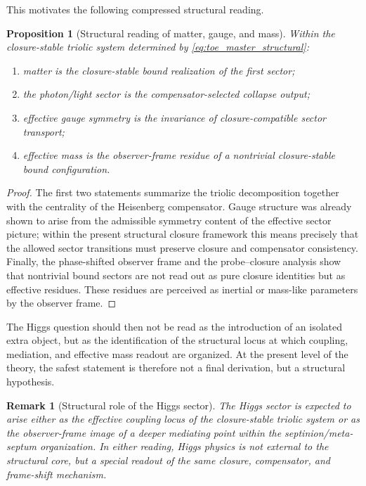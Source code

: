\documentclass[12pt,a4paper]{article}
\newtheorem{proposition}[theorem]{Proposition}
\newtheorem*{remark}{Remark}
\begin{document}
This motivates the following compressed structural reading.

\begin{proposition}[Structural reading of matter, gauge, and mass]
\label{prop:structural-matter-gauge-mass}
Within the closure-stable triolic system determined by
\eqref{eq:toe_master_structural}:
\begin{enumerate}
\item matter is the closure-stable bound realization of the first sector;
\item the photon/light sector is the compensator-selected collapse output;
\item effective gauge symmetry is the invariance of closure-compatible
sector transport;
\item effective mass is the observer-frame residue of a nontrivial
closure-stable bound configuration.
\end{enumerate}
\end{proposition}

\begin{proof}
The first two statements summarize the triolic decomposition together with the
centrality of the Heisenberg compensator. Gauge structure was already shown to
arise from the admissible symmetry content of the effective sector picture;
within the present structural closure framework this means precisely that the
allowed sector transitions must preserve closure and compensator consistency.
Finally, the phase-shifted observer frame and the probe--closure analysis show
that nontrivial bound sectors are not read out as pure closure identities but
as effective residues. These residues are perceived as inertial or mass-like
parameters by the observer frame.
\end{proof}

The Higgs question should then not be read as the introduction of an isolated
extra object, but as the identification of the structural locus at which
coupling, mediation, and effective mass readout are organized. At the present
level of the theory, the safest statement is therefore not a final derivation,
but a structural hypothesis.

\begin{remark}[Structural role of the Higgs sector]
\label{rem:structural-higgs-role}
The Higgs sector is expected to arise either as the effective coupling locus of
the closure-stable triolic system or as the observer-frame image of a deeper
mediating point within the septinion/meta-septum organization. In either
reading, Higgs physics is not external to the structural core, but a special
readout of the same closure, compensator, and frame-shift mechanism.
\end{remark}
\end{document}
